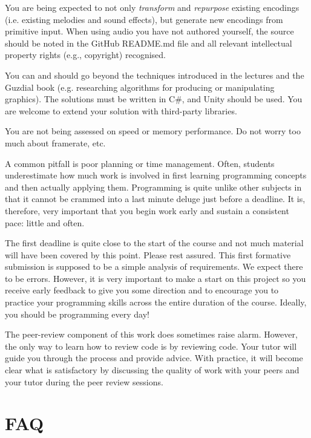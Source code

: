\documentclass{../../fal_assignment}
\begin{document}
You are being expected to not only \textit{transform} and \textit{repurpose} existing encodings (i.e. existing melodies and sound effects), but generate new encodings from primitive input. When using audio you have not authored yourself, the source should be noted in the GitHub README.md file and all relevant intellectual property rights (e.g., copyright) recognised. 

You can and should go beyond the techniques introduced in the lectures and the Guzdial book (e.g. researching algorithms for producing or manipulating graphics). The solutions must be written in C\#, and Unity should be used. You are welcome to extend your solution with third-party libraries.

You are not being assessed on speed or memory performance. Do not worry too much about framerate, etc.

A common pitfall is poor planning or time management. Often, students underestimate how much work is involved in first learning programming concepts and then actually applying them. Programming is quite unlike other subjects in that it cannot be crammed into a last minute deluge just before a deadline. It is, therefore, very important that you begin work early and sustain a consistent pace: little and often.

The first deadline is quite close to the start of the course and not much material will have been covered by this point. Please rest assured. This first formative submission is supposed to be a simple analysis of requirements. We expect there to be errors. However, it is very important to make a start on this project so you receive early feedback to give you some direction and to encourage you to practice your programming skills across the entire duration of the course. Ideally, you should be programming every day!

The peer-review component of this work does sometimes raise alarm. However, the only way to learn how to review code is by reviewing code. Your tutor will guide you through the process and provide advice. With practice, it will become clear what is satisfactory by discussing the quality of work with your peers and your tutor during the peer review sessions. 

\section*{FAQ}
\end{document}

